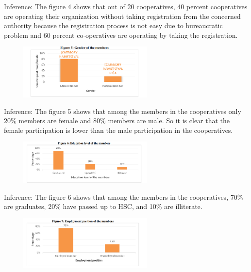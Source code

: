   Inference: The figure 4 shows that out of 20 cooperatives, 40 percent cooperatives are operating their
organization without taking registration from the concerned authority because the registration process is not easy 
due to bureaucratic problem and 60 percent co-operatives are operating by taking the registration.

\begin{figure}[h]
    \centering
    \includegraphics[width=0.6\textwidth]{Chap1/figure5.PNG}
    \label{fig:example}
  \end{figure}

  Inference: The figure 5 shows that among the members in the cooperatives only 20\% members are female and 80\% members are male. So it is clear that the female participation is lower than the male participation in the cooperatives.

  \begin{figure}[h]
    \centering
    \includegraphics[width=0.6\textwidth]{Chap1/figure6.PNG}
    \label{fig:example}
  \end{figure}

  Inference: The figure 6 shows that among the members in the cooperatives, 70\% are graduates, 20\% have passed up to HSC, and 10\% are illiterate.
  
  \begin{figure}[h]
    \centering
    \includegraphics[width=0.6\textwidth]{Chap1/figure7.PNG}
    \label{fig:example}
  \end{figure}

